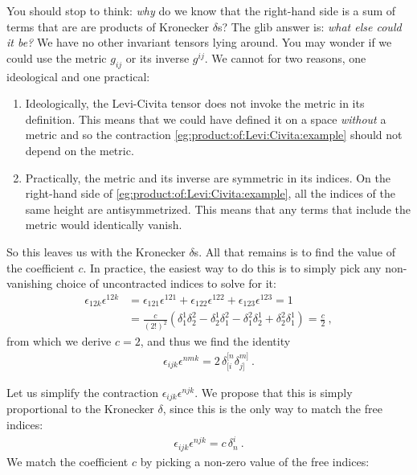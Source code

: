 \documentclass[12pt, oneside]{report}    %
\begin{document}
\begin{subappendices}
You should stop to think: \emph{why} do we know that the right-hand side is a sum of terms that are are products of Kronecker $\delta$s? The glib answer is: \emph{what else could it be?} We have no other invariant tensors lying around. You may wonder if we could use the metric $g_{ij}$ or its inverse $g^{ij}$. We cannot for two reasons, one ideological and one practical:
\begin{enumerate}
    \item Ideologically, the Levi-Civita tensor does not invoke the metric in its definition. This means that we could have defined it on a space \emph{without} a metric and so the contraction \eqref{eg:product:of:Levi:Civita:example} should not depend on the metric.
    \item Practically, the metric and its inverse are symmetric in its indices. On the right-hand side of \eqref{eg:product:of:Levi:Civita:example}, all the indices of the same height are antisymmetrized. This means that any terms that include the metric would identically vanish. 
\end{enumerate}
So this leaves us with the Kronecker $\delta$s. All that remains is to find the value of the coefficient $c$. In practice, the easiest way to do this is to simply pick any non-vanishing choice of uncontracted indices to solve for it:
\begin{align}
    \epsilon_{12k}\epsilon^{12k} &=
    \epsilon_{121}\epsilon^{121} 
    +
    \epsilon_{122}\epsilon^{122}
    +
    \epsilon_{123}\epsilon^{123}
    = 
    1 
    \\
    &= \frac{c}{(2!)^2}
    \left(
    \delta^1_1 \delta^2_2 
    - \delta^1_2 \delta^2_1
    -
    \delta^2_1 \delta^1_2 
    + \delta^2_2 \delta^1_1
    \right)
    =\frac{c}{2} \ ,
\end{align}
from which we derive $c=2$, and thus we find the identity
\begin{align}
\epsilon_{ijk}\epsilon^{nmk}
= 2 \, \delta^{[n}_{[i}\delta^{m]}_{j]}    \ .
\label{eg:product:of:Levi:Civita:example:answer} 
\end{align}
\begin{example}
Let us simplify the contraction $\epsilon_{ijk}\epsilon^{njk}$. We propose that this is simply proportional to the Kronecker $\delta$, since this is the only way to match the free indices:
\begin{align}
    \epsilon_{ijk}\epsilon^{njk} = c\, \delta^i_n \ . 
\end{align}
We match the coefficient $c$ by picking a non-zero value of the free indices:

\end{example}
\end{subappendices}
\end{document}
